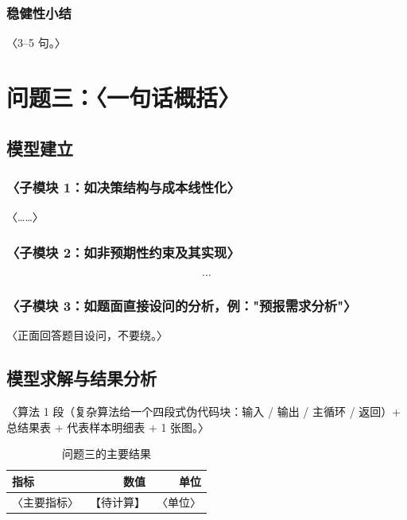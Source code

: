 \documentclass[12pt,a4paper]{ctexart}
\newif\ifwritemode
\newcommand{\ph}[1][待计算]{\textcolor{phred}{【#1】}}
\newcommand{\guide}[1]{%
  \ifwritemode\par\noindent{\small\color{guideblue}\textbf{【写作提示】}#1}\par\fi}
\newcommand{\tabhead}[1]{\textbf{#1}}
\begin{document}
\subsubsection{稳健性小结}
〈3–5 句。〉

\section{问题三：〈一句话概括〉}\label{sec:q3}
\guide{若本问特别复杂（如多阶段模型），可在 x.1 下加三级标题拆解子模块（例如「预报需求分析」）；三级标题在四问中同名同序。}

\subsection{模型建立}
\subsubsection{〈子模块 1：如决策结构与成本线性化〉}
〈……〉
\subsubsection{〈子模块 2：如非预期性约束及其实现〉}
\begin{equation}\label{eq:q3-nonant}
  \cdots
\end{equation}
\subsubsection{〈子模块 3：如题面直接设问的分析，例："预报需求分析"〉}
〈正面回答题目设问，不要绕。〉

\subsection{模型求解与结果分析}
〈算法 1 段（复杂算法给一个四段式伪代码块：输入 / 输出 / 主循环 / 返回）+ 总结果表 + 代表样本明细表 + 1 张图。〉
\begin{table}[htbp]\centering\small
  \caption{问题三的主要结果}\label{tab:q3-main}
  \begin{tabular}{lrr}
    \toprule
    \tabhead{指标} & \tabhead{数值} & \tabhead{单位} \\
    \midrule
    〈主要指标〉 & \ph & 〈单位〉 \\
    \bottomrule
  \end{tabular}
\end{table}
\end{document}
